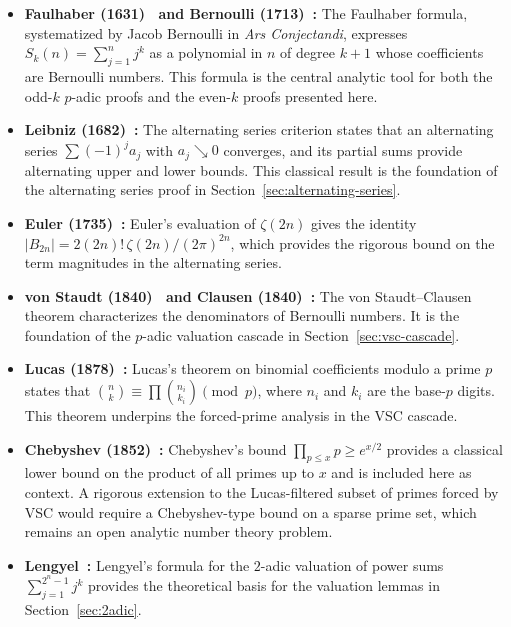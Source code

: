 \documentclass[12pt,a4paper]{article}
\theoremstyle{plain}
\theoremstyle{definition}
\begin{document}
\begin{itemize}[nosep]
  \item \textbf{Faulhaber (1631)~\cite{Faulhaber} and
    Bernoulli (1713)~\cite{Bernoulli}:} The Faulhaber formula,
    systematized by Jacob Bernoulli in \textit{Ars Conjectandi},
    expresses $S_k(n) = \sum_{j=1}^n j^k$ as a polynomial in $n$
    of degree $k+1$ whose coefficients are Bernoulli numbers.
    This formula is the central analytic tool for both the odd-$k$
    $p$-adic proofs and the even-$k$ proofs presented here.

  \item \textbf{Leibniz (1682)~\cite{Leibniz}:} The alternating series
    criterion states that an alternating series
    $\sum (-1)^j a_j$ with $a_j \searrow 0$ converges, and its
    partial sums provide alternating upper and lower bounds.
    This classical result is the foundation of the
    alternating series proof in Section~\ref{sec:alternating-series}.

  \item \textbf{Euler (1735)~\cite{Euler}:} Euler's evaluation of
    $\zeta(2n)$ gives the identity
    $|B_{2n}| = 2(2n)!\,\zeta(2n)/(2\pi)^{2n}$, which provides the
    rigorous bound on the term magnitudes in the alternating series.

  \item \textbf{von Staudt (1840)~\cite{vonStaudt} and
    Clausen (1840)~\cite{Clausen}:} The von Staudt--Clausen theorem
    characterizes the denominators of Bernoulli numbers.  It is the
    foundation of the $p$-adic valuation cascade in
    Section~\ref{sec:vsc-cascade}.

  \item \textbf{Lucas (1878)~\cite{Lucas}:} Lucas's theorem on
    binomial coefficients modulo a prime $p$ states that
    $\binom{n}{k} \equiv \prod \binom{n_i}{k_i} \pmod{p}$, where
    $n_i$ and $k_i$ are the base-$p$ digits.  This theorem
    underpins the forced-prime analysis in the VSC cascade.

  \item \textbf{Chebyshev (1852)~\cite{Chebyshev}:} Chebyshev's
    bound $\prod_{p \le x} p \ge e^{x/2}$ provides a classical
    lower bound on the product of all primes up to $x$ and is
    included here as context.  A rigorous extension to the
    Lucas-filtered subset of primes forced by VSC would require
    a Chebyshev-type bound on a sparse prime set, which remains
    an open analytic number theory problem.

  \item \textbf{Lengyel~\cite{Lengyel}:} Lengyel's formula for the
    $2$-adic valuation of power sums $\sum_{j=1}^{2^n-1} j^k$
    provides the theoretical basis for the valuation lemmas in
    Section~\ref{sec:2adic}.
\end{itemize}
\end{document}
